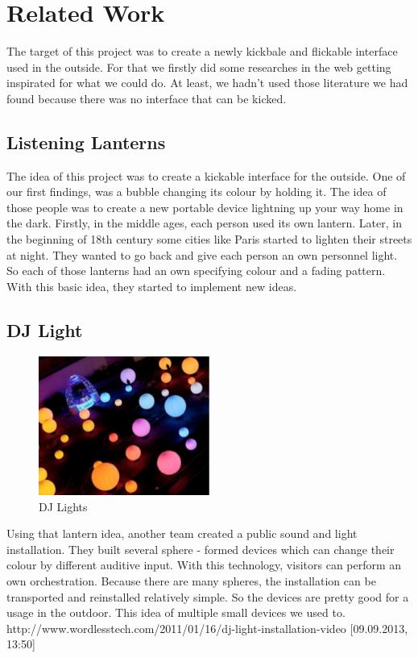 \section{Related Work}
The target of this project was to create a newly kickbale and flickable interface used in the outside. For that we firstly did some researches in the web getting inspirated for what we could do.
At least, we hadn't used those literature we had found because there was no interface that can be kicked.
 
\subsection{Listening Lanterns}
The idea of this project was to create a kickable interface for the outside. One of our first findings, was a bubble changing its colour by holding it. The idea of those people was to create a new portable device lightning up your way home in the dark. Firstly, in the middle ages, each person used its own lantern. Later, in the beginning of 18th century some cities like Paris started to lighten their streets at night. They wanted to go back and give each person an own personnel light. So each of those lanterns had an own specifying colour and a fading pattern.\newline
With this basic idea, they started to implement new ideas. \newline

\subsection{DJ Light}

\begin{figure}[h!]
	\centering
	\includegraphics[width=0.5\textwidth, clip=true, keepaspectratio=true]{./pic/dj_light.png}
	\caption{DJ Lights}
	\label{fig:DJ_Lights}
\end{figure}

Using that lantern idea, another team created a public sound and light installation.\newline
They built several sphere - formed devices which can change their colour by different auditive input. With this technology, visitors can perform an own orchestration. Because there are many spheres, the installation can be transported and reinstalled relatively simple. So the devices are pretty good for a usage in the outdoor.\newline
This idea of multiple small devices we used to. \newline 
http://www.wordlesstech.com/2011/01/16/dj-light-installation-video [09.09.2013, 13:50]\newline


